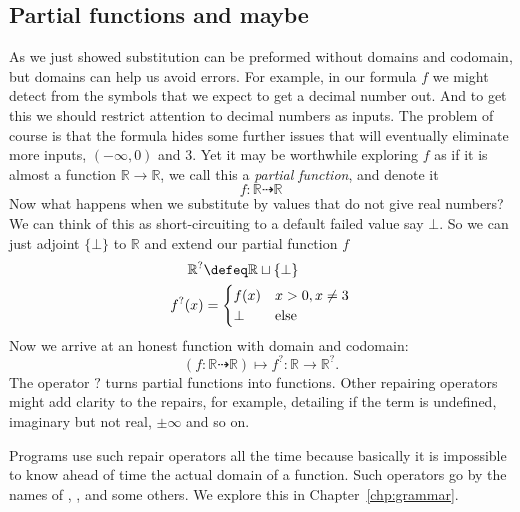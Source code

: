 \subsection{Partial functions and maybe}
As we just showed substitution can be preformed without domains and codomain, but 
domains can help us avoid errors.  For example, in our formula $f$ we might detect 
from the symbols that we expect to get a decimal number out.  And to get this 
we should restrict attention to decimal numbers as inputs. 
The problem of course is that the formula hides some further issues that will 
eventually eliminate more inputs, $(-\infty,0)$ and $3$.  Yet it may be 
worthwhile exploring $f$ as if it is almost a function $\mathbb{R}\to \mathbb{R}$,
we call this a \emph{partial function}, and denote it 
\[ 
    f:\mathbb{R}\dashrightarrow \mathbb{R}
\] 
Now what happens when we substitute by values that do not give real numbers?  We 
can think of this as short-circuiting to a default failed value say $\bot$.  So 
we can just adjoint $\{\bot\}$ to $\mathbb{R}$ and extend our partial function $f$
\begin{align*}
    \mathbb{R}^? & \defeq \mathbb{R}\sqcup \{\bot \}\\
    f^?(x) & = \begin{cases}
                f(x)  & x>0, x\neq 3\\
                \bot & \text{else}
    \end{cases}             
\end{align*}
Now we arrive at an honest function with domain and codomain:
\[
    (f:\mathbb{R}\dashrightarrow \mathbb{R})\mapsto f^?:\mathbb{R}\to \mathbb{R}^?.
\]
The operator $?$ turns partial functions into functions.
Other repairing operators might add clarity to the repairs, for example, 
detailing if the term is undefined, imaginary but not real, $\pm\infty$ and so on.

Programs use such repair operators all the time because basically it is impossible to 
know ahead of time the actual domain of a function.  Such operators go by the 
names of , ,  and some others.
We explore this in  Chapter~\ref{chp:grammar}.
